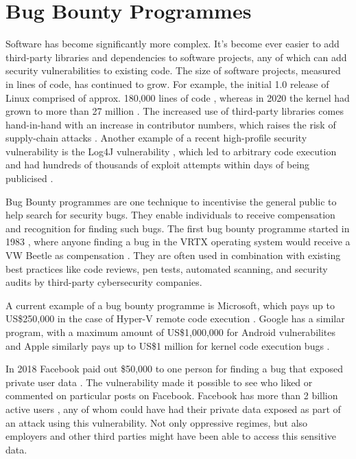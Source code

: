 \chapter{Bug Bounty Programmes}

Software has become significantly more complex. It's become ever easier to add third-party libraries and dependencies to software projects, any of which can add security vulnerabilities to existing code. The size of software projects, measured in lines of code, has continued to grow. For example, the initial 1.0 release of Linux comprised of approx. 180,000 lines of code \cite{mccandless-2020, perry-2012}, whereas in 2020 the kernel had grown to more than 27 million \cite{larabel-2020}. The increased use of third-party libraries comes hand-in-hand with an increase in contributor numbers, which raises the risk of supply-chain attacks \cite{sharma-2021}. Another example of a recent high-profile security vulnerability is the Log4J vulnerability \cite{apache-2021}, which led to arbitrary code execution and had hundreds of thousands of exploit attempts within days of being publicised \cite{raveendran-2021}.

Bug Bounty programmes are one technique to incentivise the general public to help search for security bugs. They enable individuals to receive compensation and recognition for finding such bugs. The first bug bounty programme started in 1983 \cite{hackerone-2017}, where anyone finding a bug in the VRTX operating system would receive a VW Beetle as compensation \cite{hunter-ready-inc-1983}. They are often used in combination with existing best practices like code reviews, pen tests, automated scanning, and security audits by third-party cybersecurity companies.

A current example of a bug bounty programme is Microsoft, which pays up to US\$250,000 in the case of Hyper-V remote code execution \cite{microsoft-2022}. Google has a similar program, with a maximum amount of US\$1,000,000 for Android vulnerabilites \cite{google-2022} and Apple similarly pays up to US\$1 million for kernel code execution bugs \cite{apple-inc-2022}.

In 2018 Facebook paid out \$50,000 to one person for finding a bug that exposed private user data \cite{newman-2018}. The vulnerability made it possible to see who liked or commented on particular posts on Facebook. Facebook has more than 2 billion active users \cite{datareportal-2022}, any of whom could have had their private data exposed as part of an attack using this vulnerability. Not only oppressive regimes, but also employers and other third parties might have been able to access this sensitive data.

